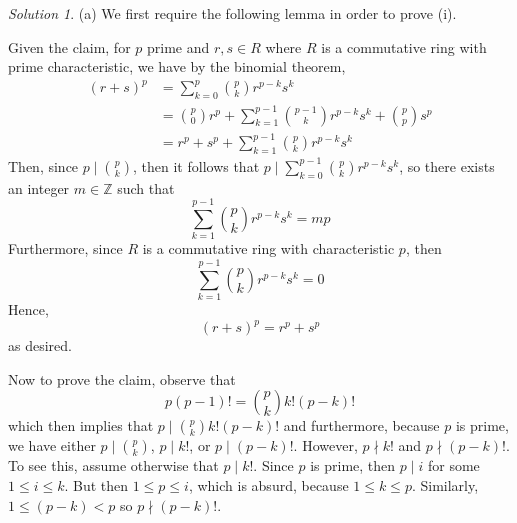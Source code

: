 \documentclass[11pt]{amsart}
\theoremstyle{definition}\newtheorem{question}{Question}
\theoremstyle{definition}\newtheorem{claim}{Claim}
\theoremstyle{remark}\newtheorem*{solution}{Solution}
\newcommand{\Z}{\mathbb{Z}}
\begin{document}
\begin{solution}
    (a) We first require the following lemma in order to prove (i).

    \begin{center}
    \end{center}

    Given the claim, for $p$ prime and $r, s \in R$ where $R$ is a commutative ring with prime characteristic, we have by the binomial theorem,
    \begin{align*}
        (r + s)^p &= \sum_{k = 0}^{p} {p \choose k} r^{p - k}s^k \\
        &= {p \choose 0} r^p + \sum_{k = 1}^{p - 1} {p - 1 \choose k} r^{p - k}s^k + {p \choose p} s^p \\
        &= r^p + s^p + \sum_{k = 1}^{p - 1} {p \choose k} r^{p- k}s^k
    \end{align*}
    Then, since $p \mid {p \choose k}$, then it follows that $p \mid \sum_{k = 0}^{p - 1} {p \choose k}r^{p - k} s^k$, so there exists an integer $m \in \Z$ such that
    \begin{equation*}
        \sum_{k = 1}^{p - 1} {p \choose k}r^{p - k}s^k = mp
    \end{equation*}
    Furthermore, since $R$ is a commutative ring with characteristic $p$, then
    \begin{equation*}
        \sum_{k = 1}^{p - 1} {p \choose k}r^{p - k}s^k = 0
    \end{equation*}
    Hence,
    \begin{equation*}
        (r + s)^p = r^p + s^p
    \end{equation*}
    as desired.

    Now to prove the claim, observe that
    \begin{equation*}
        p(p - 1)! = {p \choose k} k!(p - k)!
    \end{equation*}
    which then implies that $p \mid {p \choose k} k!(p - k)!$ and furthermore, because $p$ is prime, we have either $p \mid {p \choose k}$, $p \mid k!$, or $p \mid (p - k)!$. However, $p \nmid k!$ and $p \nmid (p - k)!$. To see this, assume otherwise that $p \mid k!$. Since $p$ is prime, then $p \mid i$ for some $1 \leq i \leq k$. But then $1 \leq p \leq i$, which is absurd, because $1 \leq k \leq p$. Similarly, $1 \leq (p - k) < p$ so $p \nmid (p - k)!$.


\end{solution}
\end{document}

